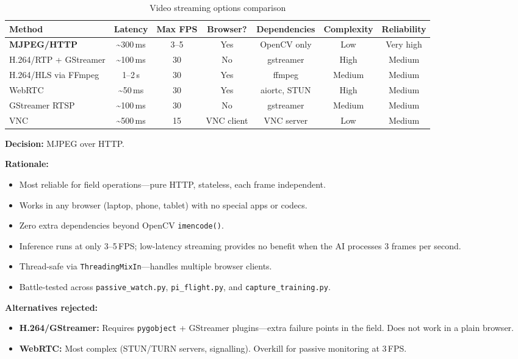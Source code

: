 \documentclass[10pt,a4paper]{article}
\newcommand{\compactTable}{\small\setlength{\tabcolsep}{3pt}\renewcommand{\arraystretch}{1.05}}
\newcommand{\ddlabel}[1]{\textbf{\color{headblue}#1}\hspace{0.5em}}
\begin{document}
\begin{table}[H]
\centering
\compactTable
\caption{Video streaming options comparison}
\label{tab:dd01-options}
\begin{tabularx}{\textwidth}{l c c c c c c}
\toprule
\textbf{Method} & \textbf{Latency} & \textbf{Max FPS} & \textbf{Browser?} & \textbf{Dependencies} & \textbf{Complexity} & \textbf{Reliability} \\
\midrule
\textbf{MJPEG/HTTP} & \textasciitilde300\,ms & 3--5 & Yes & OpenCV only & Low & Very high \\
H.264/RTP + GStreamer & \textasciitilde100\,ms & 30 & No & gstreamer & High & Medium \\
H.264/HLS via FFmpeg & 1--2\,s & 30 & Yes & ffmpeg & Medium & Medium \\
WebRTC & \textasciitilde50\,ms & 30 & Yes & aiortc, STUN & High & Medium \\
GStreamer RTSP & \textasciitilde100\,ms & 30 & No & gstreamer & Medium & Medium \\
VNC & \textasciitilde500\,ms & 15 & VNC client & VNC server & Low & Medium \\
\bottomrule
\end{tabularx}
\end{table}

\begin{decisionbox}
\textbf{Decision:} MJPEG over HTTP.
\end{decisionbox}

\ddlabel{Rationale:}
\begin{itemize}
  \item Most reliable for field operations---pure HTTP, stateless, each frame independent.
  \item Works in any browser (laptop, phone, tablet) with no special apps or codecs.
  \item Zero extra dependencies beyond OpenCV \texttt{imencode()}.
  \item Inference runs at only 3--5\,FPS; low-latency streaming provides no benefit when the AI processes 3 frames per second.
  \item Thread-safe via \texttt{ThreadingMixIn}---handles multiple browser clients.
  \item Battle-tested across \texttt{passive\_watch.py}, \texttt{pi\_flight.py}, and \texttt{capture\_training.py}.
\end{itemize}

\ddlabel{Alternatives rejected:}
\begin{itemize}
  \item \textbf{H.264/GStreamer:} Requires \texttt{pygobject} + GStreamer plugins---extra failure points in the field. Does not work in a plain browser.
  \item \textbf{WebRTC:} Most complex (STUN/TURN servers, signalling). Overkill for passive monitoring at 3\,FPS.
\end{itemize}
\end{document}

